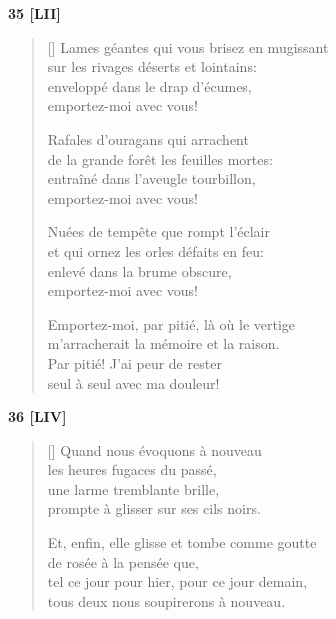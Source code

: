 \documentclass[a4paper,12pt]{book}
\begin{document}
\bigskip

\begin{center}
  \textbf{35 [LII]}
\end{center}

\settowidth{\versewidth}{Lames géantes qui vous brisez en mugissant}

\begin{verse}[\versewidth]
  Lames géantes qui vous brisez en mugissant \\
  sur les rivages déserts et lointains: \\
  enveloppé dans le drap d'écumes, \\
  emportez-moi avec vous!

  Rafales d'ouragans qui arrachent \\
  de la grande forêt les feuilles mortes: \\
  entraîné dans l'aveugle tourbillon, \\
  emportez-moi avec vous!

  Nuées de tempête que rompt l'éclair \\
  et qui ornez les orles défaits en feu: \\
  enlevé dans la brume obscure, \\
  emportez-moi avec vous!

  Emportez-moi, par pitié, là où le vertige \\
  m'arracherait la mémoire et la raison. \\
  Par pitié! J'ai peur de rester \\
  seul à seul avec ma douleur!
\end{verse}

\bigskip

\begin{center}
  \textbf{36 [LIV]}
\end{center}

\settowidth{\versewidth}{et, à nouveau, leurs fleurs s'ouvriront le soir,}

\begin{verse}[\versewidth]
  Quand nous évoquons à nouveau \\
  les heures fugaces du passé, \\
  une larme tremblante brille, \\
  prompte à glisser sur ses cils noirs.

  Et, enfin, elle glisse et tombe comme goutte \\
  de rosée à la pensée que, \\
  tel ce jour pour hier, pour ce jour demain, \\
  tous deux nous soupirerons à nouveau.
\end{verse}
\end{document}
